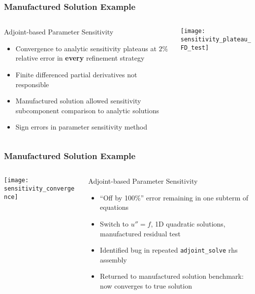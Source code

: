 \begin{frame}
\frametitle{Manufactured Solution Example}
\begin{columns}
\begin{column}{.55\textwidth}
\begin{block}{Adjoint-based Parameter Sensitivity}
\begin{itemize}
\item Convergence to analytic sensitivity plateaus at $2\%$ relative
error in {\bf every} refinement strategy
\item Finite differenced partial derivatives not responsible
\item Manufactured solution allowed sensitivity subcomponent
comparison to analytic solutions
\item Sign errors in \libMesh{} parameter sensitivity method
\end{itemize}
\end{block}
\end{column}
\begin{column}{.45\textwidth}
\texttt{[image: sensitivity\_plateau\_FD\_test]}
\end{column}
\end{columns}

\end{frame}

\begin{frame}
\frametitle{Manufactured Solution Example}
\begin{columns}
\begin{column}{.45\textwidth}
\texttt{[image: sensitivity\_convergence]}
\end{column}
\begin{column}{.55\textwidth}
\begin{block}{Adjoint-based Parameter Sensitivity}
\begin{itemize}
\item ``Off by 100\%'' error remaining in one subterm of equations
\item Switch to $u''=f$, 1D quadratic solutions, manufactured residual test
\item Identified bug in repeated \texttt{adjoint\_solve} rhs assembly
\item Returned to manufactured solution benchmark: now converges to
true solution
\end{itemize}
\end{block}
\end{column}
\end{columns}

\end{frame}


